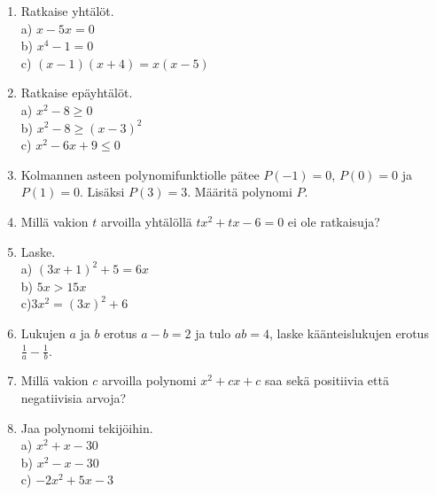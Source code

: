 \begin{enumerate}
\item Ratkaise yhtälöt.\\ a) $x-5x=0$\\ b) $x^4-1=0$\\ c) $(x-1)(x+4) = x(x-5)$
\item Ratkaise epäyhtälöt.\\ a) $x^2-8\geq0$\\ b) $x^2-8\geq(x-3)^2$\\ c) $x^2-6x+9\leq0$
\item Kolmannen asteen polynomifunktiolle pätee $P(-1)=0$, $P(0)=0$ ja $P(1)=0$. Lisäksi $P(3)=3$. Määritä polynomi $P$.
\item Millä vakion $t$ arvoilla yhtälöllä $tx^2+tx-6=0$ ei ole ratkaisuja?
\item Laske. \\ a) $(3x+1)^2+5=6x$\\ b) $5x>15x$\\ c)$3x^2=(3x)^2+6$ 
\item Lukujen $a$ ja $b$ erotus $a-b=2$ ja tulo $ab=4$, laske käänteislukujen erotus $\frac{1}{a}-\frac{1}{b}$.
\item Millä vakion $c$ arvoilla polynomi $x^2+cx+c$ saa sekä positiivia että negatiivisia arvoja?
\item Jaa polynomi tekijöihin.\\ a) $x^2+x-30$\\ b)  $x^2-x-30$\\ c)  $-2x^2+5x-3$ 
\end{enumerate}

\begin{tehtava}
	\begin{alakohdat}
	\end{alakohdat}
	\begin{vastaus}
		\begin{alakohdat}
	\end{alakohdat}
	\end{vastaus}
\end{tehtava}

